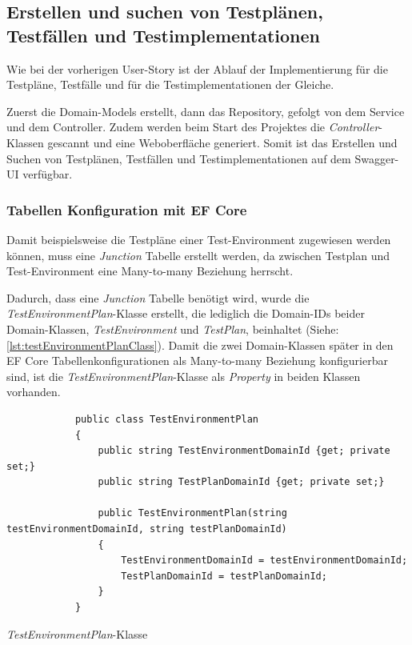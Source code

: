 \documentclass[a4paper, fontsize=11pt, parskip=half, twoside]{scrreprt}
\begin{document}
	\subsection{Erstellen und suchen von Testplänen, Testfällen und Testimplementationen} \label{subsec:createAndSearchTestplans}
	Wie bei der vorherigen User-Story ist der Ablauf der Implementierung für die Testpläne, Testfälle und für die Testimplementationen der Gleiche.
	
	Zuerst die Domain-Models erstellt, dann das Repository, gefolgt von dem Service und dem Controller.
	Zudem werden beim Start des Projektes die \emph{Controller}-Klassen gescannt und eine Weboberfläche generiert.
	Somit ist das Erstellen und Suchen von Testplänen, Testfällen und Testimplementationen auf dem Swagger-UI verfügbar. 
	
	\subsubsection{Tabellen Konfiguration mit EF Core}
	Damit beispielsweise die Testpläne einer Test-Environment zugewiesen werden können, muss eine \emph{Junction} Tabelle erstellt werden, da zwischen Testplan und Test-Environment eine Many-to-many Beziehung herrscht.
	
	Dadurch, dass eine \emph{Junction} Tabelle benötigt wird, wurde die \emph{TestEnvironmentPlan}-Klasse erstellt, die lediglich die Domain-\ac{ID}s beider Domain-Klassen, \emph{TestEnvironment} und \emph{TestPlan}, beinhaltet (Siehe: \autoref{lst:testEnvironmentPlanClass}). 
	Damit die zwei Domain-Klassen später in den \ac{EF} Core Tabellenkonfigurationen als Many-to-many Beziehung konfigurierbar sind, ist die \emph{TestEnvironmentPlan}-Klasse als \emph{Property} in beiden Klassen vorhanden.
	
	\begin{listing}[ht]
		\begin{verbatim}
			public class TestEnvironmentPlan
			{
				public string TestEnvironmentDomainId {get; private set;}
				public string TestPlanDomainId {get; private set;}
				
				public TestEnvironmentPlan(string testEnvironmentDomainId, string testPlanDomainId)
				{
					TestEnvironmentDomainId = testEnvironmentDomainId;
					TestPlanDomainId = testPlanDomainId;
				}
			}
		\end{verbatim}
		\caption{\emph{TestEnvironmentPlan}-Klasse}
		\label{lst:testEnvironmentPlanClass}
	\end{listing}
	
\end{document}
